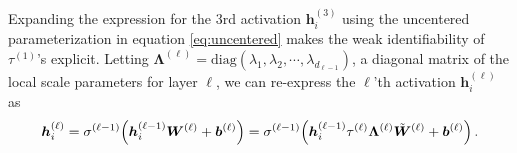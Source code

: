 Expanding the expression for the 3rd activation $\bm h_i^{(3)}$ using the uncentered parameterization in equation \ref{eq:uncentered} makes the weak identifiability of $\tau^{(1)}$'s explicit.  Letting $\bm\Lambda^{(\ell)} = \mathrm{diag}(\lambda_1, \lambda_2, \cdots, \lambda_{d_{\ell-1}})$, a diagonal matrix of the local scale parameters for layer $\ell$, we can re-express the $\ell$'th activation $\bm h_i^{(\ell)}$ as
\begin{equation}
        {\bm{h}}_i^{(\ell)}
             = \sigma^{(\ell-1)}\!\left({\bm{h}}_i^{(\ell-1)} \bm{W}^{(\ell)} + \bm{b}^{(\ell)} \right)
              = \sigma^{(\ell-1)}\!\left({\bm{h}}_i^{(\ell-1)} \tau^{(\ell)} \bm\Lambda^{(\ell)} \tilde{\bm{W}}^{(\ell)} + \bm{b}^{(\ell)} \right).
    \label{eq:hl-uncentered}
\end{equation}

